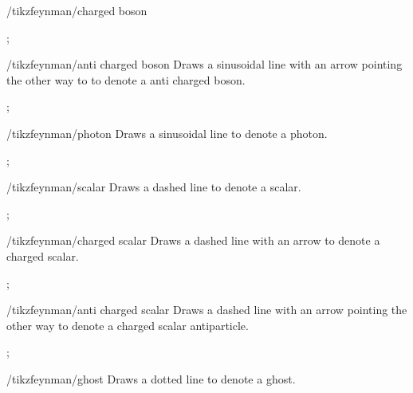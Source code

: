 \documentclass[a4paper,final]{ltxdoc}
\begin{document}
\begin{codeexample}[execute code=false]
\begin{key}{/tikzfeynman/charged boson}
\begin{codeexample}[]
;
\end{codeexample}
\end{key}

\begin{key}{/tikzfeynman/anti charged boson}
  Draws a sinusoidal line with an arrow pointing the other way to to denote a
  anti charged boson.

\begin{codeexample}[]
;
\end{codeexample}
\end{key}

\begin{key}{/tikzfeynman/photon}
  Draws a sinusoidal line to denote a photon.

\begin{codeexample}[]
;
\end{codeexample}
\end{key}

\begin{key}{/tikzfeynman/scalar}
  Draws a dashed line to denote a scalar.

\begin{codeexample}[]
;
\end{codeexample}
\end{key}

\begin{key}{/tikzfeynman/charged scalar}
  Draws a dashed line with an arrow to denote a charged scalar.

\begin{codeexample}[]
;
\end{codeexample}
\end{key}

\begin{key}{/tikzfeynman/anti charged scalar}
  Draws a dashed line with an arrow pointing the other way to denote a charged
  scalar antiparticle.

\begin{codeexample}[]
;
\end{codeexample}
\end{key}

\begin{key}{/tikzfeynman/ghost}
  Draws a dotted line to denote a ghost.


\end{key}
\end{codeexample}
\end{document}
